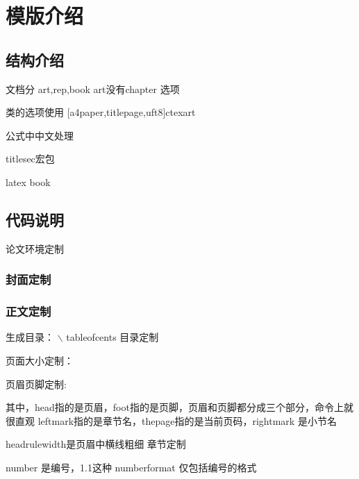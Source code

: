 \chapter{模版介绍}
\section{结构介绍}
\begin{tkzexample}
文档分 art,rep,book
art没有chapter 选项

类的选项使用
[a4paper,titlepage,uft8]{ctexart}

公式中中文处理

titlesec宏包

latex book
\end{tkzexample}


\section{代码说明}
论文环境定制
\subsection{封面定制}
\subsection{正文定制}
生成目录：
$\backslash$ tableofcents
目录定制


页面大小定制：

页眉页脚定制:
\begin{tkzexample}
\usepackage{fancyhdr}
\pagestyle{fancy}
\lhead{\leftmark}
\chead{}
\rhead{}
\lfoot{}
\cfoot{-~\thepage~-}
\rfoot{}
\renewcommand{\headrulewidth}{0pt}
\end{tkzexample}

其中，head指的是页眉，foot指的是页脚，页眉和页脚都分成三个部分，命令上就很直观
leftmark指的是章节名，thepage指的是当前页码，rightmark 是小节名

headrulewidth是页眉中横线粗细
章节定制
\begin{tkzexample}
\end{tkzexample}

number 是编号，1.1这种
numberformat 仅包括编号的格式